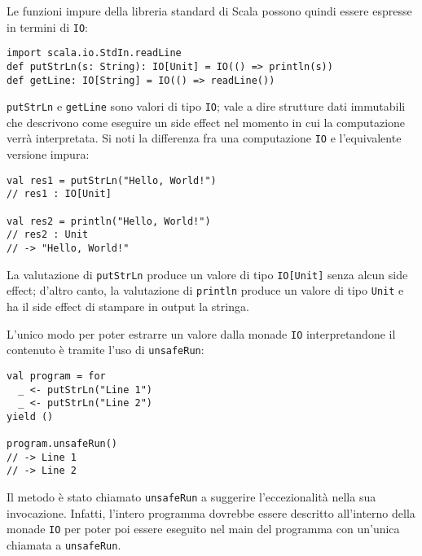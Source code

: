 Le funzioni impure della libreria standard di Scala possono quindi essere espresse in termini di \lstinline{IO}:
\begin{lstlisting}[language=scala3]
import scala.io.StdIn.readLine
def putStrLn(s: String): IO[Unit] = IO(() => println(s))
def getLine: IO[String] = IO(() => readLine())
\end{lstlisting}
\lstinline{putStrLn} e \lstinline{getLine} sono valori di tipo \lstinline{IO}; vale a dire strutture dati immutabili che descrivono come eseguire un side effect nel momento in cui la computazione verrà interpretata. Si noti la differenza fra una computazione \lstinline{IO} e l'equivalente versione impura:
\begin{lstlisting}[language=scala3]
val res1 = putStrLn("Hello, World!")
// res1 : IO[Unit]

val res2 = println("Hello, World!")
// res2 : Unit
// -> "Hello, World!"
\end{lstlisting}
La valutazione di \lstinline{putStrLn} produce un valore di tipo \lstinline{IO[Unit]} senza alcun side effect; d'altro canto, la valutazione di \lstinline{println} produce un valore di tipo \lstinline{Unit} e ha il side effect di stampare in output la stringa.

L'unico modo per poter estrarre un valore dalla monade \lstinline{IO} interpretandone il contenuto è tramite l'uso di \lstinline{unsafeRun}:
\begin{lstlisting}[language=scala3]
val program = for
  _ <- putStrLn("Line 1")
  _ <- putStrLn("Line 2")
yield ()

program.unsafeRun()
// -> Line 1
// -> Line 2
\end{lstlisting}
Il metodo è stato chiamato \lstinline{unsafeRun} a suggerire l'eccezionalità nella sua invocazione. Infatti, l'intero programma dovrebbe essere descritto all'interno della monade \lstinline{IO} per poter poi essere eseguito nel main del programma con un'unica chiamata a \lstinline{unsafeRun}.

